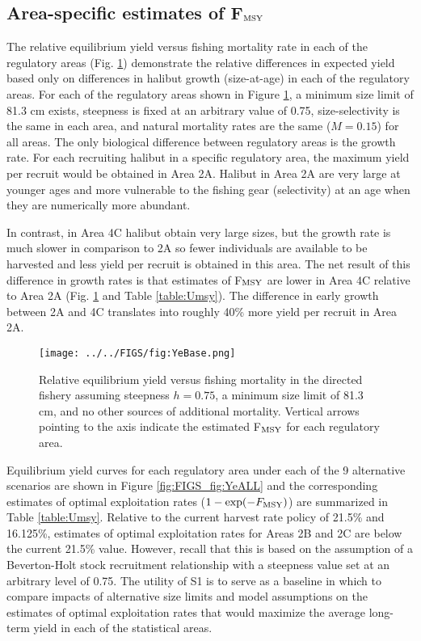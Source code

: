 \subsection*{Area-specific estimates of F$_{\rm{MSY}}$} %
\label{sub:area_specific_estimates_of_FMSY}

The relative equilibrium yield versus fishing mortality rate in each of the regulatory areas  (Fig. \ref{fig:FIGS_fig:YeBase}) demonstrate the relative differences in expected yield based only on differences in halibut growth (size-at-age) in each of the regulatory areas.  For each of the regulatory areas shown in Figure \ref{fig:FIGS_fig:YeBase}, a minimum size limit of 81.3 cm exists, steepness is fixed at an arbitrary value of 0.75, size-selectivity is the same in each area, and natural mortality rates are the same ($M=0.15$) for all areas.  The only biological difference between regulatory areas is the growth rate.  For each recruiting halibut in a specific regulatory area, the maximum yield per recruit would be obtained in Area 2A.  Halibut in Area 2A are very large at younger ages and more vulnerable to the fishing gear (selectivity) at an age when they are numerically more abundant.

In contrast, in Area 4C halibut obtain very large sizes, but the growth rate is much slower in comparison to 2A so fewer individuals are available to be harvested and less yield per recruit is obtained in this area.  The net result of this difference in growth rates is that estimates of F$_{\rm{MSY}}$ are lower in Area 4C relative to Area 2A (Fig. \ref{fig:FIGS_fig:YeBase} and Table \ref{table:Umsy}).  The difference in early growth between 2A and 4C translates into roughly 40\% more yield per recruit in Area 2A.


\begin{figure}[htbp]
	\centering
		\texttt{[image: ../../FIGS/fig:YeBase.png]}
	\caption{Relative equilibrium yield versus fishing mortality in the directed fishery assuming steepness $h=0.75$, a minimum size limit of 81.3 cm, and no other sources of additional mortality. Vertical arrows pointing to the axis indicate the estimated F$_{\rm{MSY}}$ for each regulatory area.}
	\label{fig:FIGS_fig:YeBase}
\end{figure}

Equilibrium yield curves for each regulatory area under each of the 9 alternative scenarios are shown in Figure \ref{fig:FIGS_fig:YeALL} and the corresponding estimates of optimal exploitation rates ($1-\exp(-F_{\rm{MSY}})$) are summarized in Table \ref{table:Umsy}.  Relative to the current harvest rate policy of 21.5\% and 16.125\%, estimates of optimal exploitation rates for Areas 2B and 2C are below the current 21.5\% value.   However, recall that this is based on the assumption of a Beverton-Holt stock recruitment relationship with a steepness value set at an arbitrary level of 0.75.  The utility of S1 is to serve as a baseline in which to compare impacts of alternative size limits and model assumptions on the estimates of optimal exploitation rates that would maximize the average long-term yield in each of the statistical areas.


